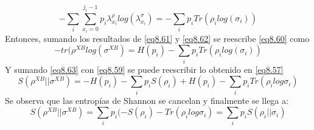\documentclass{book}
\begin{document}
    \begin{equation}\label{eq8.62}{-\sum_i\sum_{x_i=0}^{j_i-1} p_i \lambda_{x_i}^\rho log(\lambda_{x_i}^\sigma)=-\sum_ip_i Tr(\rho_ilog(\sigma_i))}\end{equation}
    Entonces, sumando los resultados de \ref{eq8.61} y \ref{eq8.62} se reescribe \ref{eq8.60} como
    \begin{equation}\label{eq8.63}{-tr(\rho^{XB}log(\sigma^{XB})=H(p_i)-\sum_i p_i Tr(\rho_ilog(\sigma_i))}\end{equation}
    Y sumando \ref{eq8.63} con \ref{eq8.59} se puede reescribir lo obtenido en \ref{eq8.57}
    \begin{equation}\label{eq8.64}{S(\rho^{XB}||\sigma^{XB})=-H(p_i)-\sum_i p_iS(\rho_i)+H(p_i)-\sum_i p_i Tr(\rho_ilog \sigma_i)}\end{equation}
    Se observa que las entropías de Shannon se cancelan y finalmente se llega a:
    \begin{equation}\label{eq8.65}{S(\rho^{XB}||\sigma^{XB})=\sum_i p_i (-S(\rho_i)-Tr(\rho_ilog\sigma_i)=\sum_i p_iS(\rho_i||\sigma_i)}\end{equation}
\end{document}
